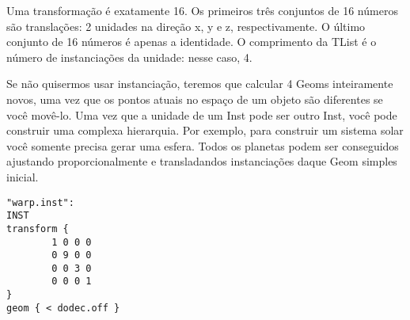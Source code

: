 \documentclass[12pt,a4paper]{book}
\begin{document}
Uma transformação é exatamente 16. Os primeiros três conjuntos de 16 números são translações:
2 unidades na direção x, y e z, respectivamente. O último conjunto de 16 números é apenas
a identidade. O comprimento da TList é o número de instanciações da unidade: nesse caso, 4.

Se não quisermos usar instanciação, teremos que calcular 4
Geoms inteiramente novos, uma vez que os pontos atuais no espaço de um objeto são
diferentes se você movê-lo. Uma vez que a unidade de um Inst pode ser outro
Inst, você pode construir uma complexa hierarquia. Por exemplo, para construir um
sistema solar você somente precisa gerar uma esfera. Todos os planetas podem ser
conseguidos ajustando proporcionalmente e transladandos instanciações daque Geom simples inicial.

\begin{verbatim}
"warp.inst":
INST
transform {
		1 0 0 0
		0 9 0 0
		0 0 3 0
		0 0 0 1
}
geom { < dodec.off }
\end{verbatim}
\end{document}
